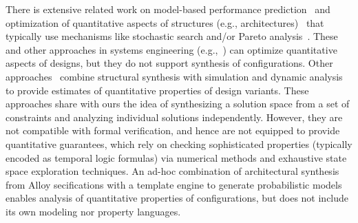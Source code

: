 \documentclass[10pt,journal,compsoc]{IEEEtran}
\begin{document}
\smallskip
{} 
There is extensive related work on model-based performance prediction~\cite{DBLP:journals/tse/BalsamoMIS04} and optimization of quantitative aspects of structures (e.g., architectures)~\cite{DBLP:journals/jss/GrunskeA13} that typically use mechanisms like stochastic search and/or Pareto analysis~\cite{DBLP:conf/icse/EsfahaniMR13,5069138,DBLP:conf/qosa/MeedeniyaMAG11,Martens:2010:AIS:1712605.1712624,Bondarev:2007:EPT:1216993.1217020,DBLP:journals/jss/BeckerKR09,DBLP:journals/tse/BroschKBR12}.
These and other approaches in systems engineering (e.g.,~\cite{MacCalman:2016:SDE:3035029.3035032}) can optimize quantitative aspects of designs, but they do not support synthesis of configurations. %
Other approaches~\cite{DBLP:conf/itng/DwivediGPS14,DBLP:conf/icse/BagheriTS14} combine structural synthesis with simulation and dynamic analysis to provide estimates of quantitative properties of design variants.
These approaches share with ours the idea of synthesizing a solution space from a set of constraints and analyzing individual solutions independently. However, they are not compatible with formal verification, and hence are not equipped to provide quantitative guarantees, which rely on checking sophisticated properties (typically encoded as temporal logic formulas) via numerical methods and exhaustive state space exploration techniques. An ad-hoc combination of architectural synthesis from Alloy secifications with a template engine to generate probabilistic models~\cite{taspub} enables analysis of quantitative properties of configurations, but does not include its own modeling nor property languages.
\end{document}
